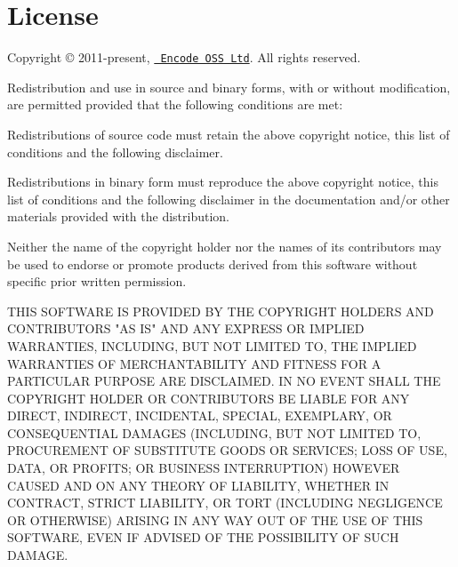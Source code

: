 \chapter{License}
\hypertarget{md_env_2lib_2python3_812_2site-packages_2djangorestframework-3_815_82_8dist-info_2LICENSE}{}\label{md_env_2lib_2python3_812_2site-packages_2djangorestframework-3_815_82_8dist-info_2LICENSE}
\label{md_env_2lib_2python3_812_2site-packages_2djangorestframework-3_815_82_8dist-info_2LICENSE_autotoc_md0}%
%
 Copyright © 2011-\/present, \href{https://www.encode.io/}{\texttt{ Encode OSS Ltd}}. All rights reserved.

Redistribution and use in source and binary forms, with or without modification, are permitted provided that the following conditions are met\+:


\begin{DoxyItemize}
\item Redistributions of source code must retain the above copyright notice, this list of conditions and the following disclaimer.
\item Redistributions in binary form must reproduce the above copyright notice, this list of conditions and the following disclaimer in the documentation and/or other materials provided with the distribution.
\item Neither the name of the copyright holder nor the names of its contributors may be used to endorse or promote products derived from this software without specific prior written permission.
\end{DoxyItemize}

THIS SOFTWARE IS PROVIDED BY THE COPYRIGHT HOLDERS AND CONTRIBUTORS "{}\+AS IS"{} AND ANY EXPRESS OR IMPLIED WARRANTIES, INCLUDING, BUT NOT LIMITED TO, THE IMPLIED WARRANTIES OF MERCHANTABILITY AND FITNESS FOR A PARTICULAR PURPOSE ARE DISCLAIMED. IN NO EVENT SHALL THE COPYRIGHT HOLDER OR CONTRIBUTORS BE LIABLE FOR ANY DIRECT, INDIRECT, INCIDENTAL, SPECIAL, EXEMPLARY, OR CONSEQUENTIAL DAMAGES (INCLUDING, BUT NOT LIMITED TO, PROCUREMENT OF SUBSTITUTE GOODS OR SERVICES; LOSS OF USE, DATA, OR PROFITS; OR BUSINESS INTERRUPTION) HOWEVER CAUSED AND ON ANY THEORY OF LIABILITY, WHETHER IN CONTRACT, STRICT LIABILITY, OR TORT (INCLUDING NEGLIGENCE OR OTHERWISE) ARISING IN ANY WAY OUT OF THE USE OF THIS SOFTWARE, EVEN IF ADVISED OF THE POSSIBILITY OF SUCH DAMAGE. 